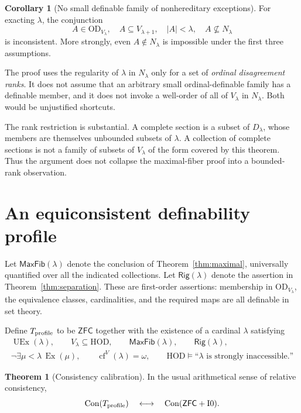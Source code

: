 \documentclass[11pt,letterpaper]{article}
\theoremstyle{definition}
\newtheorem{theorem}[definition]{Theorem}
\newtheorem{corollary}[definition]{Corollary}
\numberwithin{equation}{section}
\newcommand{\ZFC}{\mathsf{ZFC}}
\newcommand{\HOD}{\mathrm{HOD}}
\newcommand{\OD}{\mathrm{OD}}
\newcommand{\Ex}{\operatorname{Ex}}
\newcommand{\UEx}{\operatorname{UEx}}
\newcommand{\Con}{\operatorname{Con}}
\newcommand{\cf}{\operatorname{cf}}
\newcommand{\Izero}{\mathrm{I0}}
\newcommand{\MaxFib}{\mathsf{MaxFib}}
\newcommand{\Rig}{\mathsf{Rig}}
\newcommand{\Nlam}{N_\lambda}
\begin{document}
\begin{corollary}[No small definable family of nonhereditary exceptions]
For exacting $\lambda$, the conjunction
\[
A\in\OD_{V_\lambda},\quad A\subseteq V_{\lambda+1},\quad
|A|<\lambda,\quad A\not\subseteq\Nlam
\]
is inconsistent. More strongly, even $A\notin\Nlam$ is impossible under the first three assumptions.
\end{corollary}

The proof uses the regularity of $\lambda$ in $\Nlam$ only for a set of \emph{ordinal disagreement ranks}. It does not assume that an arbitrary small ordinal-definable family has a definable member, and it does not invoke a well-order of all of $V_\lambda$ in $\Nlam$. Both would be unjustified shortcuts.

The rank restriction is substantial. A complete section is a subset of $D_\lambda$, whose members are themselves unbounded subsets of $\lambda$. A collection of complete sections is not a family of subsets of $V_\lambda$ of the form covered by this theorem. Thus the argument does not collapse the maximal-fiber proof into a bounded-rank observation.

\section{An equiconsistent definability profile}\label{sec:calibration}

Let $\MaxFib(\lambda)$ denote the conclusion of Theorem~\ref{thm:maximal}, universally quantified over all the indicated collections. Let $\Rig(\lambda)$ denote the assertion in Theorem~\ref{thm:separation}. These are first-order assertions: membership in $\OD_{V_\lambda}$, the equivalence classes, cardinalities, and the required maps are all definable in set theory.

Define $T_{\rm profile}$ to be $\ZFC$ together with the existence of a cardinal $\lambda$ satisfying
\begin{equation}\label{eq:profile}
\begin{gathered}
\UEx(\lambda),\qquad V_\lambda\subseteq\HOD,\qquad
\MaxFib(\lambda),\qquad\Rig(\lambda),\\
\neg\exists\mu<\lambda\,\Ex(\mu),\qquad
\cf^V(\lambda)=\omega,\qquad
\HOD\models\text{``$\lambda$ is strongly inaccessible.''}
\end{gathered}
\end{equation}

\begin{samepage}
\begin{theorem}[Consistency calibration]\label{thm:calibration}
In the usual arithmetical sense of relative consistency,
\[
\Con(T_{\rm profile})\quad\longleftrightarrow\quad
\Con(\ZFC+\Izero).
\]
\end{theorem}
\end{samepage}
\end{document}
